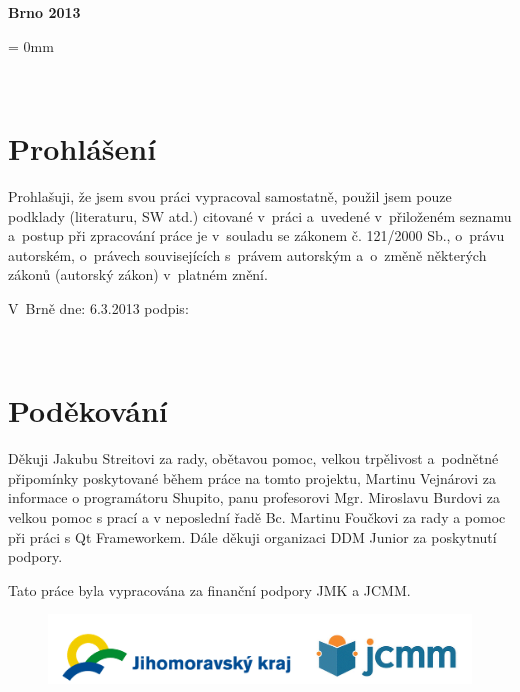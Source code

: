 \documentclass[12pt, a4paper, oneside]{article}
\newcommand{\D}{\medskip \noindent} %
\newcommand{\B}{\textbf} %
\begin{document}
\vspace{20mm}

\begin{center}
\B{Brno 2013}

\end{center}
\normalsize
\newpage  %
\voffset = 0mm %

~ %

\vspace{10mm}

\section*{Prohlášení}

Prohlašuji, že jsem svou práci vypracoval samostatně, použil jsem pouze podklady (literaturu, SW atd.) citované v~práci a~uvedené v~přiloženém seznamu a~postup při zpracování práce je v~souladu se zákonem č. 121/2000 Sb., o~právu autorském, o~právech souvisejících s~právem autorským a~o~změně některých zákonů (autorský zákon) v~platném znění. 
 
\vspace{20mm} 
 
\noindent V~Brně  dne: 6.3.2013 \hspace{50mm}                 podpis:   
 

\newpage   %

~ %
\vspace{100mm}

\section*{Poděkování}
Děkuji Jakubu Streitovi za rady, obětavou pomoc, velkou trpělivost a~podnětné připomínky poskytované během práce na tomto projektu, Martinu Vejnárovi za informace o programátoru Shupito, panu profesorovi Mgr. Miroslavu Burdovi za velkou pomoc s prací a v neposlední řadě Bc. Martinu Foučkovi za rady a pomoc při práci s Qt Frameworkem. Dále děkuji organizaci DDM Junior za poskytnutí podpory.

\D Tato práce byla vypracována za finanční podpory JMK a JCMM.

\begin{figure}[H]
\begin{center}
\includegraphics[width=\textwidth]{img/jcmm.png}
\end{center}
\end{figure}
 
\end{document}
